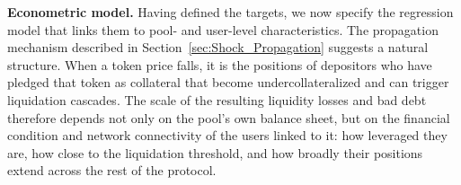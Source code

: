 \documentclass[a4paper,UKenglish,cleveref, autoref, thm-restate]{informs3}
\newcommand{\boldpara}[1]{\noindent\textbf{#1}\quad}
\begin{document}
\boldpara{Econometric model.} Having defined the targets, we now specify the regression model that links them to pool- and user-level characteristics. The propagation mechanism described in Section~\ref{sec:Shock_Propagation} suggests a natural structure. When a token price falls, it is the positions of depositors who have pledged that token as collateral that become undercollateralized and can trigger liquidation cascades. The scale of the resulting liquidity losses and bad debt therefore depends not only on the pool's own balance sheet, but on the financial condition and network connectivity of the users linked to it: how leveraged they are, how close to the liquidation threshold, and how broadly their positions extend across the rest of the protocol.
\end{document}

